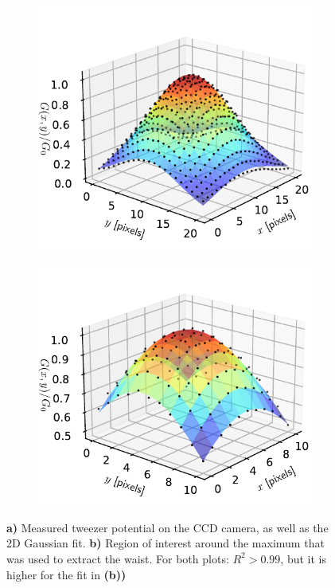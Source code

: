 \begin{figure}
\centering
	\begin{subfigure}{.49\textwidth}
	    \centering
		\includegraphics[width=0.96\linewidth]{figures/3DSpotFitGaussian.pdf}
		\caption{}
		\label{fig:3Dshowing}
	\end{subfigure}
	\begin{subfigure}{.49\textwidth}
		\centering
		\includegraphics[width=0.96\linewidth]{figures/3DSpotFitGaussianSmaller.pdf}
		\caption{}
		\label{fig:3Dwaistfit}
	\end{subfigure}
	\caption{\textsf{\textbf{a)}} Measured tweezer potential on the CCD camera, as well as the 2D Gaussian fit.
	\textsf{\textbf{b)}} Region of interest around the maximum that was used to extract the waist. For both plots: $R^2>0.99$, but it is higher for the fit in \textsf{\textbf{(b))}}}
	\label{fig:3Dfits}
\end{figure}

